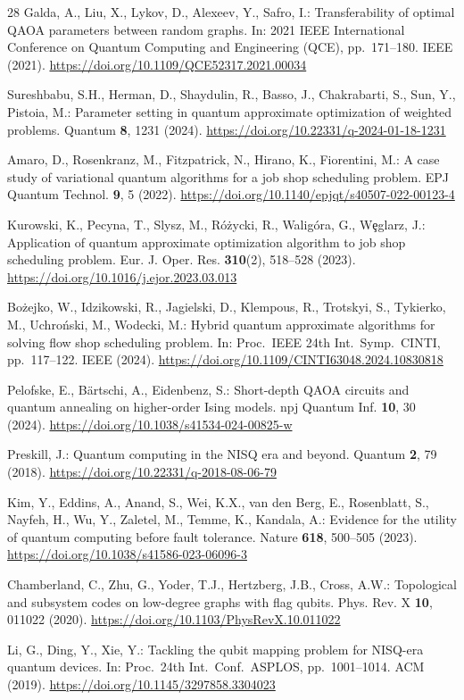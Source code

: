 \documentclass{svproc}
\newcommand{\doiurl}[1]{\mbox{\url{https://doi.org/#1}}}
\newcommand{\rev}[1]{{\color{blue}#1}}
\newcommand{\rev}[1]{#1}
\begin{document}
\begin{thebibliography}{28}
Galda, A., Liu, X., Lykov, D., Alexeev, Y., Safro, I.: Transferability of
optimal QAOA parameters between random graphs. In: 2021 IEEE
International Conference on Quantum Computing and Engineering (QCE),
pp.\ 171--180. IEEE (2021).
\doiurl{10.1109/QCE52317.2021.00034}

\rev{Sureshbabu, S.H., Herman, D., Shaydulin, R., Basso, J., Chakrabarti, S.,
Sun, Y., Pistoia, M.: Parameter setting in quantum approximate optimization
of weighted problems. Quantum \textbf{8}, 1231 (2024).
\doiurl{10.22331/q-2024-01-18-1231}}

Amaro, D., Rosenkranz, M., Fitzpatrick, N., Hirano, K., Fiorentini, M.:
A case study of variational quantum algorithms for a job shop scheduling
problem. EPJ Quantum Technol. \textbf{9}, 5 (2022).
\doiurl{10.1140/epjqt/s40507-022-00123-4}

\rev{Kurowski, K., Pecyna, T., Slysz, M., R\'{o}\.{z}ycki, R., Walig\'{o}ra, G.,
W\c{e}glarz, J.: Application of quantum approximate optimization algorithm to
job shop scheduling problem. Eur. J. Oper. Res. \textbf{310}(2), 518--528
(2023). \doiurl{10.1016/j.ejor.2023.03.013}}

\rev{Bo\.{z}ejko, W., Idzikowski, R., Jagielski, D., Klempous, R., Trotskyi, S.,
Tykierko, M., Uchro\'{n}ski, M., Wodecki, M.: Hybrid quantum approximate
algorithms for solving flow shop scheduling problem. In: Proc.\ IEEE 24th
Int.\ Symp.\ CINTI, pp.\ 117--122. IEEE (2024).
\doiurl{10.1109/CINTI63048.2024.10830818}}

\rev{Pelofske, E., B\"{a}rtschi, A., Eidenbenz, S.: Short-depth QAOA circuits
and quantum annealing on higher-order Ising models. npj Quantum Inf.
\textbf{10}, 30 (2024). \doiurl{10.1038/s41534-024-00825-w}}

Preskill, J.: Quantum computing in the NISQ era and beyond. Quantum
\textbf{2}, 79 (2018). \doiurl{10.22331/q-2018-08-06-79}

\rev{Kim, Y., Eddins, A., Anand, S., Wei, K.X., van den Berg, E., Rosenblatt, S.,
Nayfeh, H., Wu, Y., Zaletel, M., Temme, K., Kandala, A.: Evidence for the
utility of quantum computing before fault tolerance. Nature \textbf{618},
500--505 (2023). \doiurl{10.1038/s41586-023-06096-3}}

Chamberland, C., Zhu, G., Yoder, T.J., Hertzberg, J.B., Cross, A.W.:
Topological and subsystem codes on low-degree graphs with flag qubits.
Phys. Rev. X \textbf{10}, 011022 (2020).
\doiurl{10.1103/PhysRevX.10.011022}

Li, G., Ding, Y., Xie, Y.: Tackling the qubit mapping problem for
NISQ-era quantum devices. In: \rev{Proc.\ 24th Int.\ Conf.\ ASPLOS},
pp.\ 1001--1014. ACM (2019).
\doiurl{10.1145/3297858.3304023}

\end{thebibliography}
\end{document}
